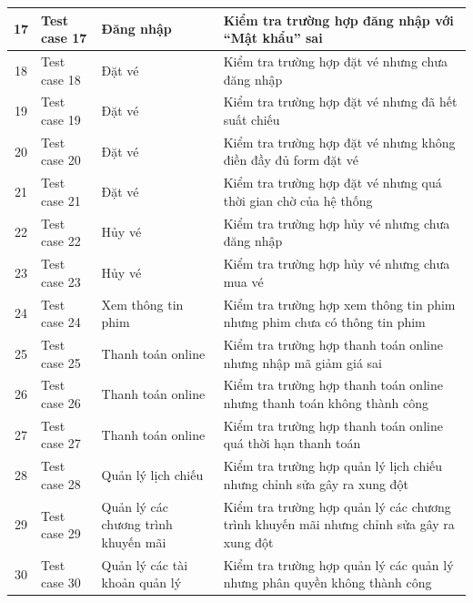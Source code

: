 \documentclass[a4paper, 12pt]{article}
\begin{document}
\begin{tabular}{|c|l|l|l|}
		\hline
		17&
		Test case 17&
		Đăng nhập&
		Kiểm tra trường hợp đăng nhập với “Mật khẩu” sai\\
		\hline
		18&
		Test case 18&
		Đặt vé &
		Kiểm tra trường hợp đặt vé nhưng chưa đăng nhập\\
		\hline
		19&
		Test case 19&
		Đặt vé&
		Kiểm tra trường hợp đặt vé nhưng đã hết suất chiếu\\
		\hline
		20&
		Test case 20&
		Đặt vé&
		Kiểm tra trường hợp đặt vé nhưng không điền đầy đủ form đặt vé\\
		\hline
		21&
		Test case 21&
		Đặt vé&
		Kiểm tra trường hợp đặt vé nhưng quá thời gian chờ của hệ thống\\
		\hline
		22&
		Test case 22&
		Hủy vé&
		Kiểm tra trường hợp hủy vé nhưng chưa đăng nhập\\
		\hline
		23&
		Test case 23&
		Hủy vé&
		Kiểm tra trường hợp hủy vé nhưng chưa mua vé\\
		\hline
		24&
		Test case 24&
		Xem thông tin phim&
		Kiểm tra trường hợp xem thông tin phim nhưng phim chưa có thông tin phim\\
		\hline
		25&
		Test case 25&
		Thanh toán online&
		Kiểm tra trường hợp thanh toán online nhưng nhập mã giảm giá sai\\
		\hline
		26&
		Test case 26&
		Thanh toán online&
		Kiểm tra trường hợp thanh toán online nhưng thanh toán không thành công\\
		\hline
		27&
		Test case 27&
		Thanh toán online&
		Kiểm tra trường hợp thanh toán online quá thời hạn thanh toán\\
		\hline
		28&
		Test case 28&
		Quản lý lịch chiếu&
		Kiểm tra trường hợp quản lý lịch chiếu nhưng chỉnh sửa gây ra xung đột\\
		\hline
		29&
		Test case 29&
		Quản lý các chương trình khuyến mãi&
		Kiểm tra trường hợp quản lý các chương trình khuyến mãi nhưng chỉnh sửa gây ra xung đột\\
		\hline
		30&
		Test case 30&
		Quản lý các tài khoản quản lý&
		Kiểm tra trường hợp quản lý các quản lý nhưng phân quyền không thành công\\
		\hline

	\end{tabular}
\end{document}
